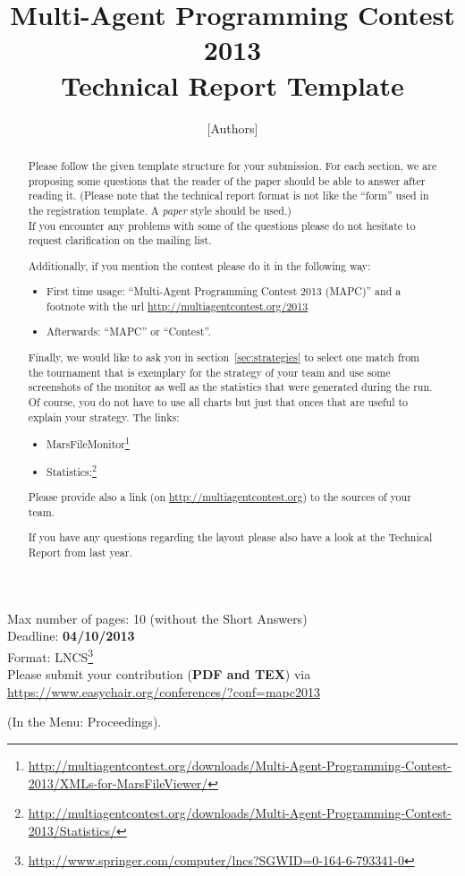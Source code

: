 \documentclass{llncs}
\begin{document}
\title{Multi-Agent Programming Contest 2013\\Technical Report Template}
\author{[Authors]}
\institute{[Affiliation]}
\maketitle

\begin{center}
Max number of pages: 10 (without the Short Answers) \\
Deadline: \textbf{04/10/2013}\\
Format: LNCS\footnote{\url{http://www.springer.com/computer/lncs?SGWID=0-164-6-793341-0}}\\
Please submit your contribution (\textbf{PDF and TEX}) via\\ \url{https://www.easychair.org/conferences/?conf=mapc2013}

(In the Menu: Proceedings).
\end{center}

\begin{abstract}
Please follow the given template structure for your submission. For each section, we are proposing some questions that the reader of the paper should be able to answer after reading it. (Please note that the technical report format is not like the ``form'' used in the registration template. A \emph{paper} style should be used.)\\ If you encounter any problems with some of the questions please do not hesitate to request clarification on the mailing list.

Additionally, if you mention the contest please do it in the following way:
\begin{itemize}
\item First time usage: "`Multi-Agent Programming Contest 2013 (MAPC)"' and a footnote with the url \url{http://multiagentcontest.org/2013}
\item Afterwards: "`MAPC"' or "`Contest"'.
\end{itemize}

Finally, we would like to ask you in section~\ref{sec:strategies} to select one match from the tournament that is exemplary for the strategy of your team and  use some screenshots of the monitor as well as the statistics that were generated during the run. Of course, you do not have to use all charts but just that onces that are useful to explain your strategy. The links:
\begin{itemize}
\item MarsFileMonitor\footnote{\url{http://multiagentcontest.org/downloads/Multi-Agent-Programming-Contest-2013/XMLs-for-MarsFileViewer/}}
\item Statistics:\footnote{\url{http://multiagentcontest.org/downloads/Multi-Agent-Programming-Contest-2013/Statistics/}}
\end{itemize}

Please provide also a link (on \url{http://multiagentcontest.org}) to the sources of your team.

If you have any questions regarding the layout please also have a look at the Technical Report from last year.
\newpage
\end{abstract}
\end{document}
